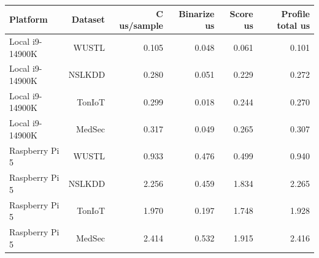 \begin{tabular}{lrrrrr}
\toprule
Platform & Dataset & C us/sample & Binarize us & Score us & Profile total us \\
\midrule
Local i9-14900K & WUSTL & 0.105 & 0.048 & 0.061 & 0.101 \\
Local i9-14900K & NSLKDD & 0.280 & 0.051 & 0.229 & 0.272 \\
Local i9-14900K & TonIoT & 0.299 & 0.018 & 0.244 & 0.270 \\
Local i9-14900K & MedSec & 0.317 & 0.049 & 0.265 & 0.307 \\
Raspberry Pi 5 & WUSTL & 0.933 & 0.476 & 0.499 & 0.940 \\
Raspberry Pi 5 & NSLKDD & 2.256 & 0.459 & 1.834 & 2.265 \\
Raspberry Pi 5 & TonIoT & 1.970 & 0.197 & 1.748 & 1.928 \\
Raspberry Pi 5 & MedSec & 2.414 & 0.532 & 1.915 & 2.416 \\
\bottomrule
\end{tabular}
